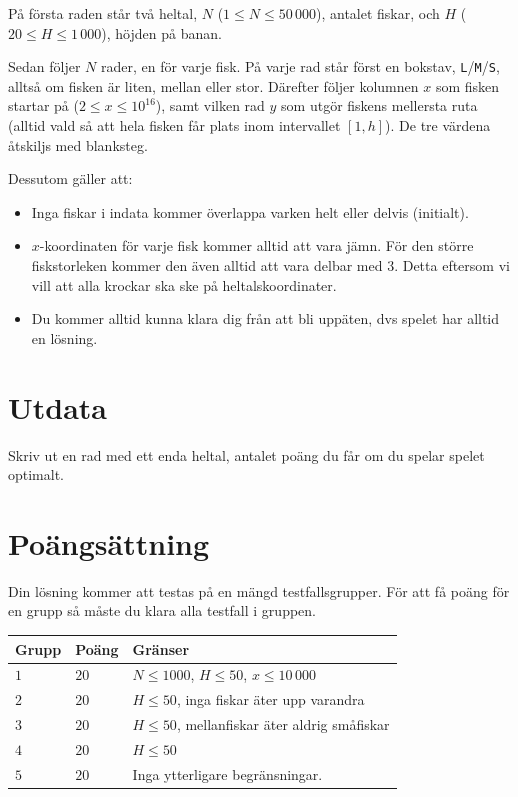 På första raden står två heltal, $N$ ($1 \leq N \leq 50\,000$), antalet fiskar, och $H$ ($20 \leq H \leq 1\,000$),
höjden på banan. 

Sedan följer $N$ rader, en för varje fisk. På varje rad står först en bokstav, \texttt{L}/\texttt{M}/\texttt{S}, alltså
om fisken är liten, mellan eller stor. Därefter följer kolumnen $x$ som fisken startar på ($2 \leq x \leq 10^{16}$),
samt vilken rad $y$ som utgör fiskens mellersta ruta (alltid vald så att hela fisken får plats inom intervallet $[1, h]$).
De tre värdena åtskiljs med blanksteg.

Dessutom gäller att:
\begin{itemize}
  \item
    Inga fiskar i indata kommer överlappa varken helt eller delvis (initialt).
  \item
      $x$-koordinaten för varje fisk kommer alltid att vara jämn. För den större
      fiskstorleken kommer den även alltid att vara delbar med 3. Detta
      eftersom vi vill att alla krockar ska ske på heltalskoordinater.
  \item
    Du kommer alltid kunna klara dig från att bli uppäten, dvs spelet har
    alltid en lösning.
\end{itemize}

\section*{Utdata}
Skriv ut en rad med ett enda heltal, antalet poäng du får om du spelar spelet optimalt.

\section*{Poängsättning}
Din lösning kommer att testas på en mängd testfallsgrupper.
För att få poäng för en grupp så måste du klara alla testfall i gruppen.

\noindent
\begin{tabular}{| l | l | l |}
  \hline
  \textbf{Grupp} & \textbf{Poäng} & \textbf{Gränser} \\ \hline
  $1$   & $20$       & $N \leq 1000$, $H \leq 50$, $x \leq 10\,000$ \\ \hline
  $2$   & $20$       & $H \leq 50$, inga fiskar äter upp varandra \\ \hline
  $3$   & $20$       & $H \leq 50$, mellanfiskar äter aldrig småfiskar \\ \hline
  $4$   & $20$       & $H \leq 50$ \\ \hline
  $5$   & $20$       & Inga ytterligare begränsningar. \\ \hline
\end{tabular}

